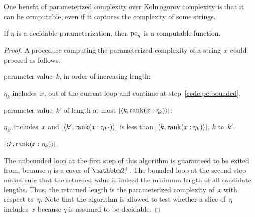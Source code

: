 One benefit of parameterized complexity over Kolmogorov complexity is that it can be computable, even if it captures the complexity of some strings.
\begin{lemma}
\label{lem:pccomputable}%
  If $\eta$ is a decidable parameterization, then $\operatorname{pc}_\eta$ is a computable function.
\end{lemma}
\begin{proof}
  A procedure computing the parameterized complexity of a string~$x$ could proceed as follows.
  \begin{codelisting}
  \item
     parameter value~$k$, in order of increasing length:
    \begin{codelisting}
    \item
       $\eta_k$ includes~$x$,
      \itemcont {} out of the current loop and continue at step~\ref{code:pc:bounded}.
    \end{codelisting}
  \item\label{code:pc:bounded}%
     parameter value~$k'$ of length at most ${\lvert{\langle k, \operatorname{rank}(x : \eta_k)\rangle}\rvert}$:
    \begin{codelisting}
    \item
       $\eta_{k'}$ includes~$x$ and $\length{\pair{k'}{\rank(x : \eta_{k'})}}$ is less than $\length{\pair{k}{\rank(x : \eta_k)}}$,
      \itemcont {} $k$ to~$k'$.
    \end{codelisting}
    \item
       ${\lvert{\langle k, \operatorname{rank}(x : \eta_k)\rangle}\rvert}$.
  \end{codelisting}
  The unbounded loop at the first step of this algorithm is guaranteed to be exited from, because $\eta$ is a cover of $\binary^+$.
  The bounded loop at the second step makes sure that the returned value is indeed the minimum length of all candidate lengths.
  Thus, the returned length is the parameterized complexity of~$x$ with respect to~$\eta$.
  Note that the algorithm is allowed to test whether a slice of~$\eta$ includes~$x$ because $\eta$ is assumed to be decidable.
\end{proof}

